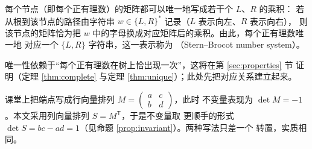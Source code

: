 \begin{corollary}\label{cor:sbn}
每个节点（即每个正有理数）的矩阵都可以唯一地写成若干个 $L$、$R$ 的乘积：
若从根到该节点的路径由字符串 $w\in\{L,R\}^*$ 记录（$L$ 表示向左、$R$ 表示向右），
则该节点的矩阵恰为把 $w$ 中的字母换成对应矩阵后的乘积。由此，每个正有理数唯一地
对应一个 $\{L,R\}$ 字符串，这一表示称为 
（Stern--Brocot number system）。
\end{corollary}

唯一性依赖于``每个正有理数在树上恰出现一次''，这将在第 \ref{sec:properties} 节
证明（定理 \ref{thm:complete} 与定理 \ref{thm:unique}）；此处先把对应关系建立起来。

\begin{remark}
课堂上把端点写成行向量排列 $M=\begin{pmatrix}a&c\\ b&d\end{pmatrix}$，此时
不变量表现为 $\det M=-1$。本文采用列向量排列 $S=M^{\mathsf T}$，于是不变量取
更顺手的形式 $\det S=bc-ad=1$（见命题 \ref{prop:invariant}）。两种写法只差一个
转置，实质相同。
\end{remark}
